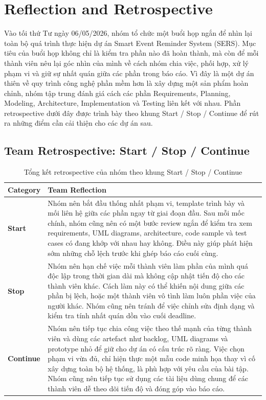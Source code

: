 \section{Reflection and Retrospective}

Vào tối thứ Tư ngày 06/05/2026, nhóm tổ chức một buổi họp ngắn để nhìn lại toàn bộ quá trình thực hiện dự án Smart Event Reminder System (SERS). Mục tiêu của buổi họp không chỉ là kiểm tra phần nào đã hoàn thành, mà còn để mỗi thành viên nêu lại góc nhìn của mình về cách nhóm chia việc, phối hợp, xử lý phạm vi và giữ sự nhất quán giữa các phần trong báo cáo. Vì đây là một dự án thiên về quy trình công nghệ phần mềm hơn là xây dựng một sản phẩm hoàn chỉnh, nhóm tập trung đánh giá cách các phần Requirements, Planning, Modeling, Architecture, Implementation và Testing liên kết với nhau. Phần retrospective dưới đây được trình bày theo khung Start / Stop / Continue để rút ra những điểm cần cải thiện cho các dự án sau.

\subsection{Team Retrospective: Start / Stop / Continue}

\begin{table}[H]
\centering
\renewcommand{\arraystretch}{1.5}
\begin{tabularx}{\linewidth}{|l|X|}
\hline
\textbf{Category} & \textbf{Team Reflection} \\
\hline
\textbf{Start} & Nhóm nên bắt đầu thống nhất phạm vi, template trình bày và mối liên hệ giữa các phần ngay từ giai đoạn đầu. Sau mỗi mốc chính, nhóm cũng nên có một bước review ngắn để kiểm tra xem requirements, UML diagrams, architecture, code sample và test cases có đang khớp với nhau hay không. Điều này giúp phát hiện sớm những chỗ lệch trước khi ghép báo cáo cuối cùng. \\
\hline
\textbf{Stop} & Nhóm nên hạn chế việc mỗi thành viên làm phần của mình quá độc lập trong thời gian dài mà không cập nhật tiến độ cho các thành viên khác. Cách làm này có thể khiến nội dung giữa các phần bị lệch, hoặc một thành viên vô tình làm luôn phần việc của người khác. Nhóm cũng nên tránh để việc chỉnh sửa định dạng và kiểm tra tính nhất quán dồn vào cuối deadline. \\
\hline
\textbf{Continue} & Nhóm nên tiếp tục chia công việc theo thế mạnh của từng thành viên và dùng các artefact như backlog, UML diagrams và prototype nhỏ để giữ cho dự án có cấu trúc rõ ràng. Việc chọn phạm vi vừa đủ, chỉ hiện thực một mẫu code minh họa thay vì cố xây dựng toàn bộ hệ thống, là phù hợp với yêu cầu của bài tập. Nhóm cũng nên tiếp tục sử dụng các tài liệu dùng chung để các thành viên dễ theo dõi tiến độ và đóng góp vào báo cáo. \\
\hline
\end{tabularx}
\caption{Tổng kết retrospective của nhóm theo khung Start / Stop / Continue}
\end{table}

